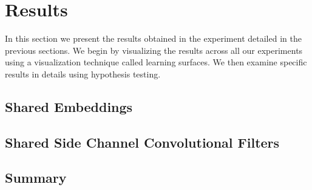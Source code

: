 \chapter{Results}
In this section we present the results obtained in the experiment detailed in the previous sections. We begin by visualizing the results across all our experiments using a visualization technique called learning surfaces. We then examine specific results in details using hypothesis testing.

\section{Shared Embeddings}
\section{Shared Side Channel Convolutional Filters}

\section{Summary}